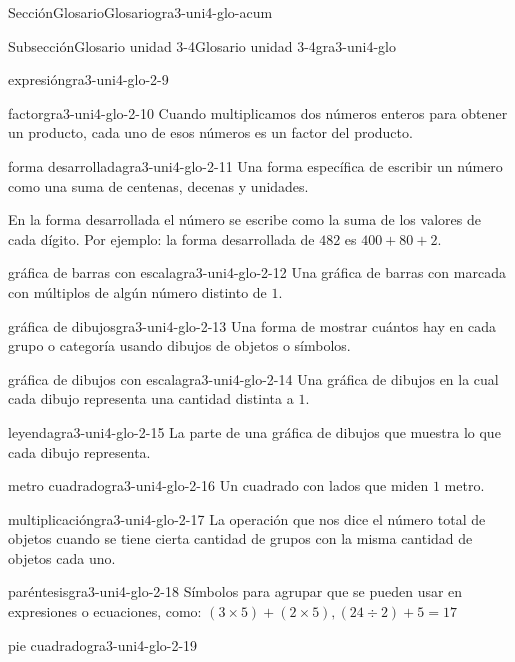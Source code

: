 \documentclass[oneside,10pt,]{article}
\begin{document}
\begin{sectionptx}{Sección}{Glosario}{}{Glosario}{}{}{gra3-uni4-glo-acum}
\begin{subsectionptx}{Subsección}{Glosario unidad 3-4}{}{Glosario unidad 3-4}{}{}{gra3-uni4-glo}
\begin{descriptionlist}
\begin{dlimedium}{expresión}{gra3-uni4-glo-2-9}
\end{dlimedium}%
\begin{dlimedium}{factor}{gra3-uni4-glo-2-10}%
Cuando multiplicamos dos números enteros para obtener un producto, cada uno de esos números es un factor del producto.%
\end{dlimedium}%
\begin{dlimedium}{forma desarrollada}{gra3-uni4-glo-2-11}%
Una forma específica de escribir un número como una suma de centenas, decenas y unidades.%
\par
En la forma desarrollada el número se escribe como la suma de los valores de cada dígito. Por ejemplo: la forma desarrollada de \(482\) es \(400 + 80 + 2\).%
\end{dlimedium}%
\begin{dlimedium}{gráfica de barras con escala}{gra3-uni4-glo-2-12}%
Una gráfica de barras con marcada con múltiplos de algún número distinto de \(1\).%
\end{dlimedium}%
\begin{dlimedium}{gráfica de dibujos}{gra3-uni4-glo-2-13}%
Una forma de mostrar cuántos hay en cada grupo o categoría usando dibujos de objetos o símbolos.%
\end{dlimedium}%
\begin{dlimedium}{gráfica de dibujos con escala}{gra3-uni4-glo-2-14}%
Una gráfica de dibujos en la cual cada dibujo representa una cantidad distinta a \(1\).%
\end{dlimedium}%
\begin{dlimedium}{leyenda}{gra3-uni4-glo-2-15}%
La parte de una gráfica de dibujos que muestra lo que cada dibujo representa.%
\end{dlimedium}%
\begin{dlimedium}{metro cuadrado}{gra3-uni4-glo-2-16}%
Un cuadrado con lados que miden \(1\) metro.%
\end{dlimedium}%
\begin{dlimedium}{multiplicación}{gra3-uni4-glo-2-17}%
La operación que nos dice el número total de objetos cuando se tiene cierta cantidad de grupos con la misma cantidad de objetos cada uno.%
\end{dlimedium}%
\begin{dlimedium}{paréntesis}{gra3-uni4-glo-2-18}%
Símbolos para agrupar que se pueden usar en expresiones o ecuaciones, como: \((3 \times 5) + (2 \times 5), (24 \div 2) + 5 = 17\)%
\end{dlimedium}%
\begin{dlimedium}{pie cuadrado}{gra3-uni4-glo-2-19}%

\end{dlimedium}
\end{descriptionlist}
\end{subsectionptx}
\end{sectionptx}
\end{document}
